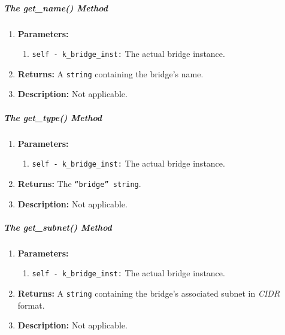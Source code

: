         \subparagraph{The get\_name() Method}
            \begin{enumerate}
                \item \textbf{Parameters:}
                \begin{enumerate}
                    \item \texttt{self - k\_bridge\_inst:} The actual bridge instance.
                \end{enumerate}
                \item \textbf{Returns:} A \texttt{string} containing the bridge's name.
                \item \textbf{Description:} Not applicable.
            \end{enumerate}

        \subparagraph{The get\_type() Method}
            \begin{enumerate}
                \item \textbf{Parameters:}
                \begin{enumerate}
                    \item \texttt{self - k\_bridge\_inst:} The actual bridge instance.
                \end{enumerate}
                \item \textbf{Returns:} The \texttt{``bridge'' string}.
                \item \textbf{Description:} Not applicable.
            \end{enumerate}

        \subparagraph{The get\_subnet() Method}
            \begin{enumerate}
                \item \textbf{Parameters:}
                \begin{enumerate}
                    \item \texttt{self - k\_bridge\_inst:} The actual bridge instance.
                \end{enumerate}
                \item \textbf{Returns:} A \texttt{string} containing the bridge's associated subnet in \textit{CIDR} format.
                \item \textbf{Description:} Not applicable.
            \end{enumerate}

